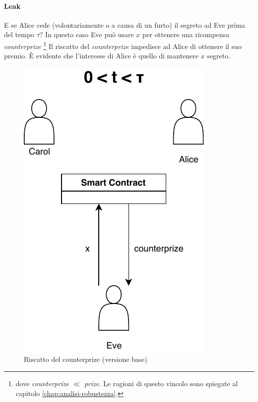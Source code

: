 \paragraph{Leak}
E se Alice cede (volontariamente o a causa di un furto)
il segreto ad Eve prima del tempo $ \tau $?
In questo caso Eve può usare $ x $ per ottenere una ricompensa
\textit{counterprize} \footnote{dove \textit{counterprize} $ \ll $ \textit{prize}.
	Le ragioni di questo vincolo sono spiegate al capitolo \ref{chap:analisi-robustezza}.}
Il riscatto del \textit{counterprize} impedisce ad Alice di ottenere il suo premio.
È evidente che l'interesse di Alice è quello di mantenere $ x $ segreto.
\begin{figure}[H]
	\begin{minipage}{0.4\textwidth}
		\centering
		\includegraphics[width=.7\linewidth]{images/chap_protocollo/base-leak-1.pdf}
		\caption{Riscatto del counterprize (versione base)}
	\end{minipage}\hfill
	\begin{minipage}{0.4\textwidth}
		\centering

\end{minipage}
\end{figure}
